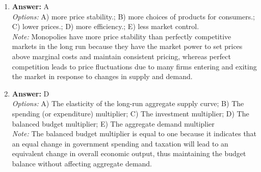 \documentclass[12pt]{article}
\begin{document}
\begin{enumerate}[label=\arabic*.]
\item \textbf{Answer:} A
\\ \textit{Options:} A) more price stability.; B) more choices of products for consumers.; C) lower prices.; D) more efficiency.; E) less market control.
\\ \textit{Note:} Monopolies have more price stability than perfectly competitive markets in the long run because they have the market power to set prices above marginal costs and maintain consistent pricing, whereas perfect competition leads to price fluctuations due to many firms entering and exiting the market in response to changes in supply and demand.
\item \textbf{Answer:} D
\\ \textit{Options:} A) The elasticity of the long-run aggregate supply curve; B) The spending (or expenditure) multiplier; C) The investment multiplier; D) The balanced budget multiplier; E) The aggregate demand multiplier
\\ \textit{Note:} The balanced budget multiplier is equal to one because it indicates that an equal change in government spending and taxation will lead to an equivalent change in overall economic output, thus maintaining the budget balance without affecting aggregate demand.
\end{enumerate}
\end{document}
